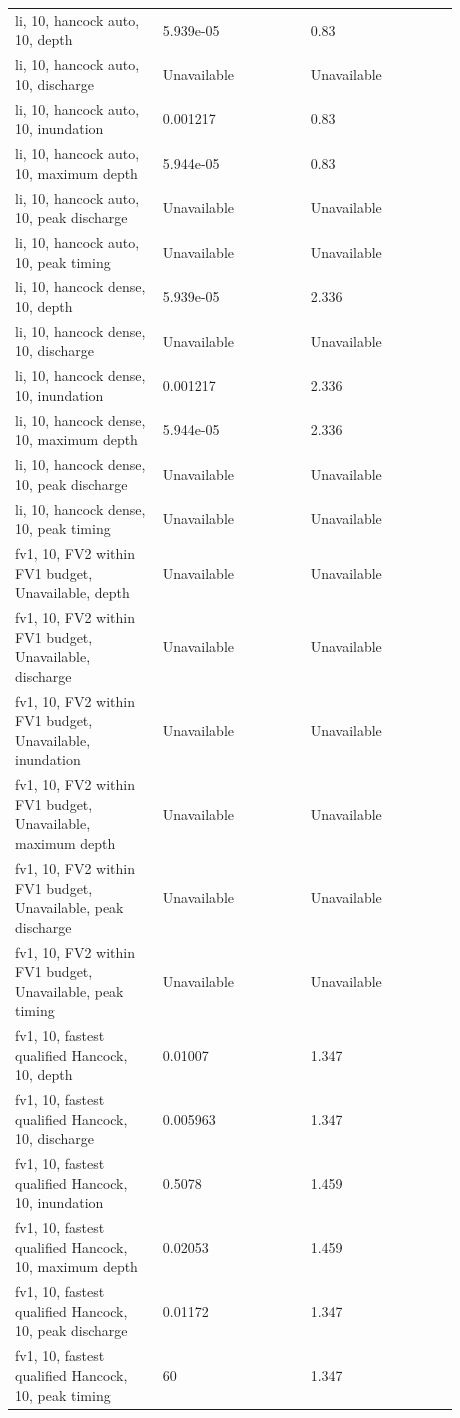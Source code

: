 \begin{longtable}{p{0.2933\linewidth}p{0.2933\linewidth}p{0.2933\linewidth}}
li, 10, hancock auto, 10, depth & 5.939e-05 & 0.83 \\
li, 10, hancock auto, 10, discharge & Unavailable & Unavailable \\
li, 10, hancock auto, 10, inundation & 0.001217 & 0.83 \\
li, 10, hancock auto, 10, maximum depth & 5.944e-05 & 0.83 \\
li, 10, hancock auto, 10, peak discharge & Unavailable & Unavailable \\
li, 10, hancock auto, 10, peak timing & Unavailable & Unavailable \\
li, 10, hancock dense, 10, depth & 5.939e-05 & 2.336 \\
li, 10, hancock dense, 10, discharge & Unavailable & Unavailable \\
li, 10, hancock dense, 10, inundation & 0.001217 & 2.336 \\
li, 10, hancock dense, 10, maximum depth & 5.944e-05 & 2.336 \\
li, 10, hancock dense, 10, peak discharge & Unavailable & Unavailable \\
li, 10, hancock dense, 10, peak timing & Unavailable & Unavailable \\
fv1, 10, FV2 within FV1 budget, Unavailable, depth & Unavailable & Unavailable \\
fv1, 10, FV2 within FV1 budget, Unavailable, discharge & Unavailable & Unavailable \\
fv1, 10, FV2 within FV1 budget, Unavailable, inundation & Unavailable & Unavailable \\
fv1, 10, FV2 within FV1 budget, Unavailable, maximum depth & Unavailable & Unavailable \\
fv1, 10, FV2 within FV1 budget, Unavailable, peak discharge & Unavailable & Unavailable \\
fv1, 10, FV2 within FV1 budget, Unavailable, peak timing & Unavailable & Unavailable \\
fv1, 10, fastest qualified Hancock, 10, depth & 0.01007 & 1.347 \\
fv1, 10, fastest qualified Hancock, 10, discharge & 0.005963 & 1.347 \\
fv1, 10, fastest qualified Hancock, 10, inundation & 0.5078 & 1.459 \\
fv1, 10, fastest qualified Hancock, 10, maximum depth & 0.02053 & 1.459 \\
fv1, 10, fastest qualified Hancock, 10, peak discharge & 0.01172 & 1.347 \\
fv1, 10, fastest qualified Hancock, 10, peak timing & 60 & 1.347 \\

\end{longtable}
